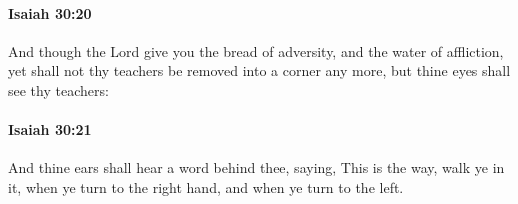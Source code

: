 		\paragraph{Isaiah 30:20} %
			\label{ISAIAH-30-20}

			And though the Lord give you the bread of adversity, and the water of affliction, yet shall not thy teachers be removed into a corner any more, but thine eyes shall see thy teachers:


		\paragraph{Isaiah 30:21} %
			\label{ISAIAH-30-21}

			And thine ears shall hear a word behind thee, saying, This is the way, walk ye in it, when ye turn to the right hand, and when ye turn to the left.


